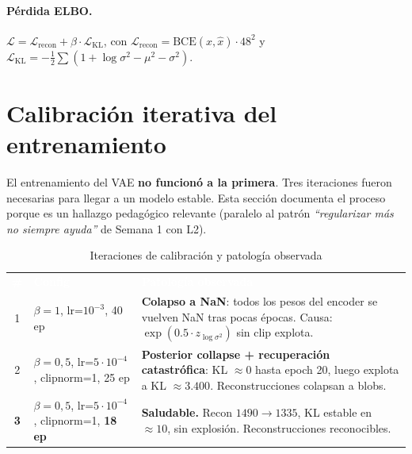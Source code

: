 \documentclass[10pt,a4paper,twocolumn]{article}
\begin{document}
\paragraph{Pérdida ELBO.} $\mathcal{L} = \mathcal{L}_{\text{recon}} + \beta \cdot \mathcal{L}_{\text{KL}}$, con $\mathcal{L}_{\text{recon}} = \text{BCE}(x, \hat{x}) \cdot 48^2$ y $\mathcal{L}_{\text{KL}} = -\frac{1}{2} \sum (1 + \log\sigma^2 - \mu^2 - \sigma^2)$.

\section{Calibración iterativa del entrenamiento}

El entrenamiento del VAE \textbf{no funcionó a la primera}. Tres iteraciones fueron necesarias para llegar a un modelo estable. Esta sección documenta el proceso porque es un hallazgo pedagógico relevante (paralelo al patrón \textit{``regularizar más no siempre ayuda''} de Semana 1 con L2).

\begin{table}[H]
\centering
\caption{Iteraciones de calibración y patología observada}
\label{tab:iteraciones}
\small
\renewcommand{\arraystretch}{1.25}
\begin{tabularx}{\columnwidth}{c >{\raggedright\arraybackslash}p{2.3cm} X}
\rowcolor{tableheader}\textcolor{white}{\textbf{\#}} & \textcolor{white}{\textbf{Config}} & \textcolor{white}{\textbf{Patología observada}}\\
\rowcolor{warning}
1 & $\beta=1$, lr=$10^{-3}$, 40 ep & \textbf{Colapso a NaN}: todos los pesos del encoder se vuelven NaN tras pocas épocas. Causa: $\exp(0.5 \cdot z_{\log\sigma^2})$ sin clip explota.\\
\rowcolor{warning}
2 & $\beta=0{,}5$, lr=$5 \cdot 10^{-4}$, clipnorm=1, 25 ep & \textbf{Posterior collapse + recuperación catastrófica}: KL $\approx 0$ hasta epoch 20, luego explota a KL $\approx 3.400$. Reconstrucciones colapsan a blobs.\\
\rowcolor{highlight}
\textbf{3} & $\beta=0{,}5$, lr=$5 \cdot 10^{-4}$, clipnorm=1, \textbf{18 ep} & \textbf{Saludable.} Recon $1490 \to 1335$, KL estable en $\approx 10$, sin explosión. Reconstrucciones reconocibles.\\
\end{tabularx}
\end{table}
\end{document}
